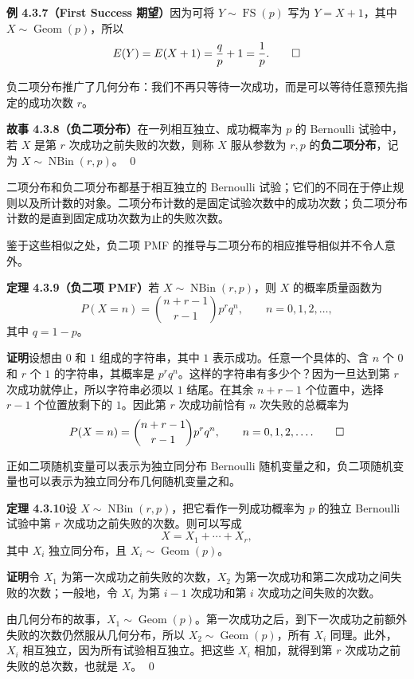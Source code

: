 \documentclass[UTF8, 12pt, fontset=fandol, oneside]{ctexart}
\begin{document}
\noindent\textbf{例 4.3.7（First Success 期望）}\quad 因为可将 $Y\sim\operatorname{FS}(p)$ 写为 $Y=X+1$，其中 $X\sim\operatorname{Geom}(p)$，所以
\[
  E(Y)=E(X+1)=\frac{q}{p}+1=\frac{1}{p}. \qed
\]

负二项分布推广了几何分布：我们不再只等待一次成功，而是可以等待任意预先指定的成功次数 $r$。

\noindent\textbf{故事 4.3.8（负二项分布）}\quad 在一列相互独立、成功概率为 $p$ 的 Bernoulli 试验中，若 $X$ 是第 $r$ 次成功之前失败的次数，则称 $X$ 服从参数为 $r,p$ 的\textbf{负二项分布}，记为 $X\sim\operatorname{NBin}(r,p)$。 \qed

二项分布和负二项分布都基于相互独立的 Bernoulli 试验；它们的不同在于停止规则以及所计数的对象。二项分布计数的是固定试验次数中的成功次数；负二项分布计数的是直到固定成功次数为止的失败次数。

鉴于这些相似之处，负二项 PMF 的推导与二项分布的相应推导相似并不令人意外。

\noindent\textbf{定理 4.3.9（负二项 PMF）}\quad 若 $X\sim\operatorname{NBin}(r,p)$，则 $X$ 的概率质量函数为
\[
  P(X=n)=\binom{n+r-1}{r-1}p^rq^n,\qquad n=0,1,2,\ldots,
\]
其中 $q=1-p$。

\noindent\textbf{证明}\quad 设想由 $0$ 和 $1$ 组成的字符串，其中 $1$ 表示成功。任意一个具体的、含 $n$ 个 $0$ 和 $r$ 个 $1$ 的字符串，其概率是 $p^rq^n$。这样的字符串有多少个？因为一旦达到第 $r$ 次成功就停止，所以字符串必须以 $1$ 结尾。在其余 $n+r-1$ 个位置中，选择 $r-1$ 个位置放剩下的 $1$。因此第 $r$ 次成功前恰有 $n$ 次失败的总概率为
\[
  P(X=n)=\binom{n+r-1}{r-1}p^rq^n,\qquad n=0,1,2,\ldots. \qed
\]

正如二项随机变量可以表示为独立同分布 Bernoulli 随机变量之和，负二项随机变量也可以表示为独立同分布几何随机变量之和。

\noindent\textbf{定理 4.3.10}\quad 设 $X\sim\operatorname{NBin}(r,p)$，把它看作一列成功概率为 $p$ 的独立 Bernoulli 试验中第 $r$ 次成功之前失败的次数。则可以写成
\[
  X=X_1+\cdots+X_r,
\]
其中 $X_i$ 独立同分布，且 $X_i\sim\operatorname{Geom}(p)$。

\noindent\textbf{证明}\quad 令 $X_1$ 为第一次成功之前失败的次数，$X_2$ 为第一次成功和第二次成功之间失败的次数；一般地，令 $X_i$ 为第 $i-1$ 次成功和第 $i$ 次成功之间失败的次数。

由几何分布的故事，$X_1\sim\operatorname{Geom}(p)$。第一次成功之后，到下一次成功之前额外失败的次数仍然服从几何分布，所以 $X_2\sim\operatorname{Geom}(p)$，所有 $X_i$ 同理。此外，$X_i$ 相互独立，因为所有试验相互独立。把这些 $X_i$ 相加，就得到第 $r$ 次成功之前失败的总次数，也就是 $X$。 \qed
\end{document}

